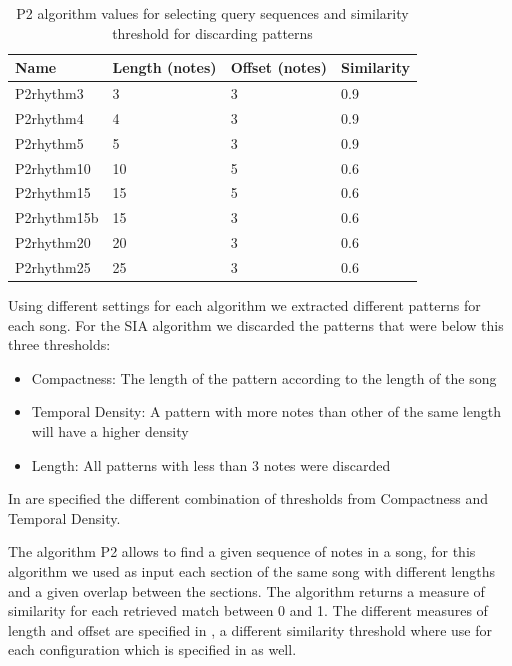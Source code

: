 \documentclass{article}
\begin{document}
\begin{table}
 \begin{center}
 \begin{tabular}{|l|l|l|p{1.2cm}|}
  \hline
  Name & Length (notes) & Offset (notes) & Similarity  \\
  \hline
  P2rhythm3 & 3 & 3 & 0.9 \\
  \hline
  P2rhythm4 & 4 & 3 & 0.9 \\
  \hline
  P2rhythm5 & 5 & 3 & 0.9 \\
  \hline
  P2rhythm10 & 10 & 5 & 0.6 \\
  \hline
  P2rhythm15 & 15 & 5 & 0.6 \\
  \hline
  P2rhythm15b & 15 & 3 & 0.6 \\
  \hline
  P2rhythm20 & 20 & 3 & 0.6 \\
  \hline
  P2rhythm25 & 25 & 3 & 0.6 \\
  \hline
 \end{tabular}
\end{center}
 \caption{P2 algorithm values for selecting query sequences and similarity threshold for discarding patterns}
 \label{p2rhythm}
\end{table}


Using different settings for each algorithm we extracted different patterns for each song. For the SIA algorithm we discarded the patterns that were below this three thresholds:
\begin{itemize}
\item Compactness: The length of the pattern according to the length of the song
\item Temporal Density: A pattern with more notes than other of the same length will have a higher density
\item Length: All patterns with less than 3 notes were discarded
\end{itemize}

In  are specified the different combination of thresholds from Compactness and Temporal Density.

The algorithm P2 allows to find a given sequence of notes in a song, for this algorithm we used as input each section of the same song with different lengths and a given overlap between the sections. The algorithm returns a measure of similarity for each retrieved match between 0 and 1. The different measures of length and offset are specified in , a different similarity threshold where use for each configuration which is specified in  as well. 
\end{document}
